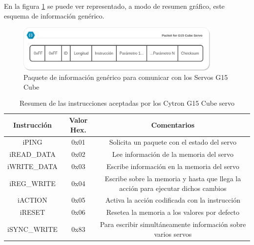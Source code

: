     En la figura \ref{fig:app:registrosg15:comunicacion_mensaje} se puede ver representado, a modo de resumen gráfico, este esquema de información genérico.	
    
    \begin{figure}[H]
    	\centering
    	\includegraphics[width=0.9\textwidth]{figuras/Imagenes_SW/Packet_G15.png}   
    	\caption{Paquete de información genérico para comunicar con los Servos G15 Cube}
    	\label{fig:app:registrosg15:comunicacion_mensaje}
    \end{figure}
	

	\begin{table}[htbp]
		\centering
		\caption{Resumen de las instrucciones aceptadas por los Cytron G15 Cube servo}
		\label{tab:g15_instructions}
		\begin{center}
			\begin{tabular}{|c|c|c|}
			\hline
			\textbf{Instrucción} & \textbf{Valor Hex.} & \textbf{Comentarios} \\
			\hline
			iPING & 0x01 & Solicita un paquete con el estado del servo \\
			\hline
			iREAD\_DATA & 0x02 & Lee información de la memoria del servo \\
			\hline
			iWRITE\_DATA & 0x03 & Escribe información en la memoria del servo \\
			\hline
			iREG\_WRITE & 0x04 & Escribe sobre la memoria y hasta que llega la acción \ingles{ACTION} para ejecutar dichos cambios \\
			\hline
			iACTION & 0x05 & Activa la acción codificada con la instrucción \ingles{REG\_WRITE} \\
			\hline
			iRESET & 0x06 & Resetea la memoria a los valores por defecto \\
			\hline
			iSYNC\_WRITE & 0x83 & Para escribir simultáneamente información sobre varios servos \\
			\hline
			\end{tabular}
		\end{center}
	\end{table}	
	
